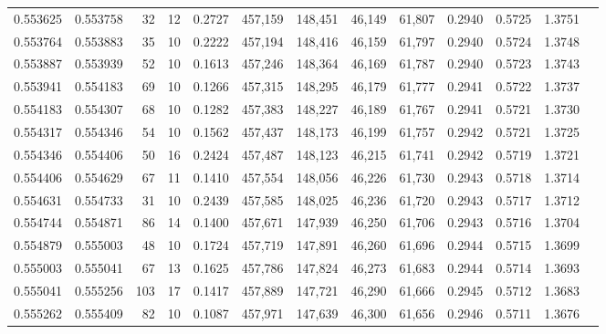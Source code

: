 \begin{tabular}{rrrrrrrrrrrrr}
0.553625 & 0.553758 &    32 &  12 &                                     0.2727 & 457,159 & 148,451 &  46,149 &  61,807 & 0.2940 & 0.5725 & 1.3751 \\
0.553764 & 0.553883 &    35 &  10 &                                     0.2222 & 457,194 & 148,416 &  46,159 &  61,797 & 0.2940 & 0.5724 & 1.3748 \\
0.553887 & 0.553939 &    52 &  10 &                                     0.1613 & 457,246 & 148,364 &  46,169 &  61,787 & 0.2940 & 0.5723 & 1.3743 \\
0.553941 & 0.554183 &    69 &  10 &                                     0.1266 & 457,315 & 148,295 &  46,179 &  61,777 & 0.2941 & 0.5722 & 1.3737 \\
0.554183 & 0.554307 &    68 &  10 &                                     0.1282 & 457,383 & 148,227 &  46,189 &  61,767 & 0.2941 & 0.5721 & 1.3730 \\
0.554317 & 0.554346 &    54 &  10 &                                     0.1562 & 457,437 & 148,173 &  46,199 &  61,757 & 0.2942 & 0.5721 & 1.3725 \\
0.554346 & 0.554406 &    50 &  16 &                                     0.2424 & 457,487 & 148,123 &  46,215 &  61,741 & 0.2942 & 0.5719 & 1.3721 \\
0.554406 & 0.554629 &    67 &  11 &                                     0.1410 & 457,554 & 148,056 &  46,226 &  61,730 & 0.2943 & 0.5718 & 1.3714 \\
0.554631 & 0.554733 &    31 &  10 &                                     0.2439 & 457,585 & 148,025 &  46,236 &  61,720 & 0.2943 & 0.5717 & 1.3712 \\
0.554744 & 0.554871 &    86 &  14 &                                     0.1400 & 457,671 & 147,939 &  46,250 &  61,706 & 0.2943 & 0.5716 & 1.3704 \\
0.554879 & 0.555003 &    48 &  10 &                                     0.1724 & 457,719 & 147,891 &  46,260 &  61,696 & 0.2944 & 0.5715 & 1.3699 \\
0.555003 & 0.555041 &    67 &  13 &                                     0.1625 & 457,786 & 147,824 &  46,273 &  61,683 & 0.2944 & 0.5714 & 1.3693 \\
0.555041 & 0.555256 &   103 &  17 &                                     0.1417 & 457,889 & 147,721 &  46,290 &  61,666 & 0.2945 & 0.5712 & 1.3683 \\
0.555262 & 0.555409 &    82 &  10 &                                     0.1087 & 457,971 & 147,639 &  46,300 &  61,656 & 0.2946 & 0.5711 & 1.3676 \\

\end{tabular}
